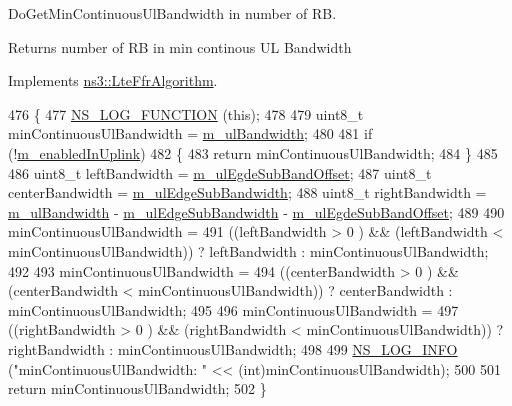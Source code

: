 Do\+Get\+Min\+Continuous\+Ul\+Bandwidth in number of RB. 

\begin{DoxyReturn}{Returns}
number of RB in min continous UL Bandwidth 
\end{DoxyReturn}


Implements \hyperlink{classns3_1_1LteFfrAlgorithm_a419e7a62dd16efa3d593d72e9495c724}{ns3\+::\+Lte\+Ffr\+Algorithm}.


\begin{DoxyCode}
476 \{
477   \hyperlink{log-macros-disabled_8h_a90b90d5bad1f39cb1b64923ea94c0761}{NS\_LOG\_FUNCTION} (\textcolor{keyword}{this});
478 
479   uint8\_t minContinuousUlBandwidth = \hyperlink{classns3_1_1LteFfrAlgorithm_acfa0105633ee5c27538c3309eb132d21}{m\_ulBandwidth};
480 
481   \textcolor{keywordflow}{if} (!\hyperlink{classns3_1_1LteFfrAlgorithm_a6c681821267dfedf7083600005db4bee}{m\_enabledInUplink})
482     \{
483       \textcolor{keywordflow}{return} minContinuousUlBandwidth;
484     \}
485 
486   uint8\_t leftBandwidth = \hyperlink{classns3_1_1LteFrSoftAlgorithm_a10b3660c54a8f9f05f05708509283f11}{m\_ulEgdeSubBandOffset};
487   uint8\_t centerBandwidth = \hyperlink{classns3_1_1LteFrSoftAlgorithm_a32a47126b3423faab9941788f5ea78a3}{m\_ulEdgeSubBandwidth};
488   uint8\_t rightBandwidth = \hyperlink{classns3_1_1LteFfrAlgorithm_acfa0105633ee5c27538c3309eb132d21}{m\_ulBandwidth} - \hyperlink{classns3_1_1LteFrSoftAlgorithm_a32a47126b3423faab9941788f5ea78a3}{m\_ulEdgeSubBandwidth} - 
      \hyperlink{classns3_1_1LteFrSoftAlgorithm_a10b3660c54a8f9f05f05708509283f11}{m\_ulEgdeSubBandOffset};
489 
490   minContinuousUlBandwidth =
491     ((leftBandwidth > 0 ) && (leftBandwidth < minContinuousUlBandwidth)) ? leftBandwidth : 
      minContinuousUlBandwidth;
492 
493   minContinuousUlBandwidth =
494     ((centerBandwidth > 0 ) && (centerBandwidth < minContinuousUlBandwidth)) ? centerBandwidth : 
      minContinuousUlBandwidth;
495 
496   minContinuousUlBandwidth =
497     ((rightBandwidth > 0 ) && (rightBandwidth < minContinuousUlBandwidth)) ? rightBandwidth : 
      minContinuousUlBandwidth;
498 
499   \hyperlink{group__logging_gafbd73ee2cf9f26b319f49086d8e860fb}{NS\_LOG\_INFO} (\textcolor{stringliteral}{"minContinuousUlBandwidth: "} << (\textcolor{keywordtype}{int})minContinuousUlBandwidth);
500 
501   \textcolor{keywordflow}{return} minContinuousUlBandwidth;
502 \}
\end{DoxyCode}
